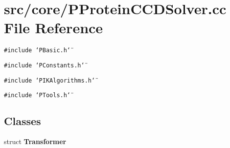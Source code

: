 \section{src/core/PProtein\-CCDSolver.cc File Reference}
\label{PProteinCCDSolver_8cc}


{\tt \#include \char`\"{}PBasic.h\char`\"{}}\par
{\tt \#include \char`\"{}PConstants.h\char`\"{}}\par
{\tt \#include \char`\"{}PIKAlgorithms.h\char`\"{}}\par
{\tt \#include \char`\"{}PTools.h\char`\"{}}\par
\subsection*{Classes}
\begin{CompactItemize}
\item 
struct {\bf Transformer}
\end{CompactItemize}
